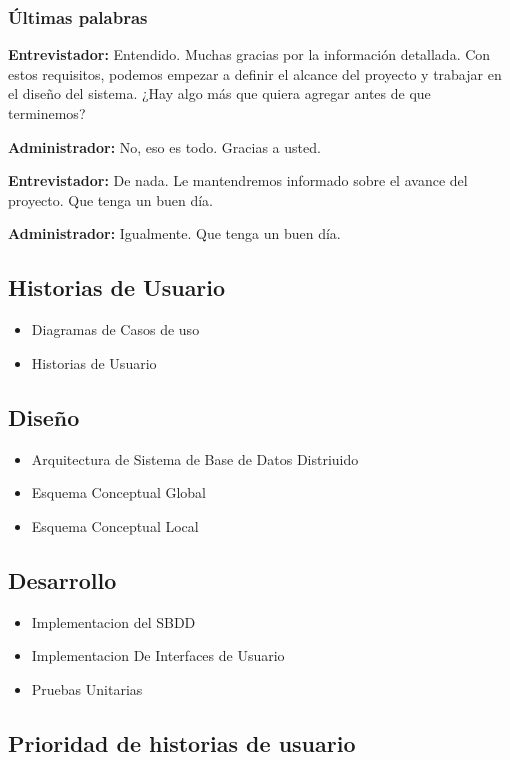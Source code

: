\documentclass[spanish,12pt]{article}
\providecommand{\tightlist}{\setlength{\itemsep}{0pt}\setlength{\parskip}{0pt}}
\begin{document}
\subsubsection{Últimas palabras}\label{uxfaltimas-palabras}

\textbf{Entrevistador:} Entendido. Muchas gracias por la información
detallada. Con estos requisitos, podemos empezar a definir el alcance
del proyecto y trabajar en el diseño del sistema. ¿Hay algo más que
quiera agregar antes de que terminemos?

\textbf{Administrador:} No, eso es todo. Gracias a usted.

\textbf{Entrevistador:} De nada. Le mantendremos informado sobre el
avance del proyecto. Que tenga un buen día.

\textbf{Administrador:} Igualmente. Que tenga un buen día.

\subsection{Historias de Usuario}\label{historias-de-usuario}

\begin{itemize}
\tightlist
\item
  Diagramas de Casos de uso
\item
  Historias de Usuario
\end{itemize}

\subsection{Diseño}\label{diseuxf1o}

\begin{itemize}
\tightlist
\item
  Arquitectura de Sistema de Base de Datos Distriuido
\item
  Esquema Conceptual Global
\item
  Esquema Conceptual Local
\end{itemize}

\subsection{Desarrollo}\label{desarrollo}

\begin{itemize}
\tightlist
\item
  Implementacion del SBDD
\item
  Implementacion De Interfaces de Usuario
\item
  Pruebas Unitarias
\end{itemize}

\subsection{Prioridad de historias de
usuario}\label{prioridad-de-historias-de-usuario}
\end{document}
